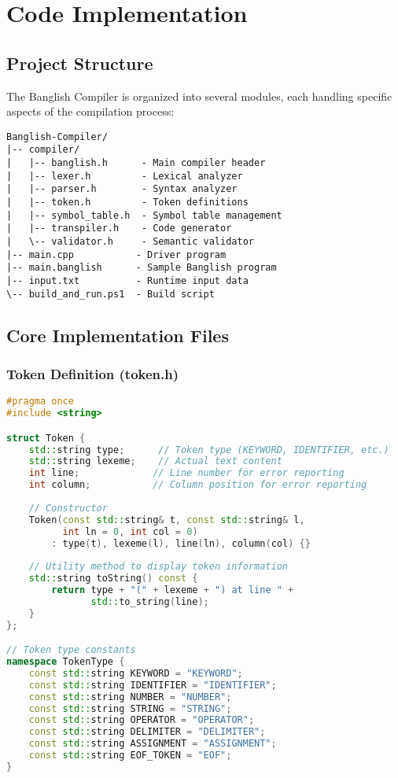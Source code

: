 \documentclass[12pt,a4paper]{article}
\begin{document}
\section{Code Implementation}

\subsection{Project Structure}

The Banglish Compiler is organized into several modules, each handling specific aspects of the compilation process:

\begin{verbatim}
Banglish-Compiler/
|-- compiler/
|   |-- banglish.h      - Main compiler header
|   |-- lexer.h         - Lexical analyzer
|   |-- parser.h        - Syntax analyzer  
|   |-- token.h         - Token definitions
|   |-- symbol_table.h  - Symbol table management
|   |-- transpiler.h    - Code generator
|   \-- validator.h     - Semantic validator
|-- main.cpp           - Driver program
|-- main.banglish      - Sample Banglish program
|-- input.txt          - Runtime input data
\-- build_and_run.ps1  - Build script
\end{verbatim}

\subsection{Core Implementation Files}

\subsubsection{Token Definition (token.h)}

\begin{lstlisting}[language=C++, caption=Token Structure Definition]
#pragma once
#include <string>

struct Token {
    std::string type;      // Token type (KEYWORD, IDENTIFIER, etc.)
    std::string lexeme;    // Actual text content
    int line;             // Line number for error reporting
    int column;           // Column position for error reporting
    
    // Constructor
    Token(const std::string& t, const std::string& l, 
          int ln = 0, int col = 0)
        : type(t), lexeme(l), line(ln), column(col) {}
    
    // Utility method to display token information
    std::string toString() const {
        return type + "(" + lexeme + ") at line " + 
               std::to_string(line);
    }
};

// Token type constants
namespace TokenType {
    const std::string KEYWORD = "KEYWORD";
    const std::string IDENTIFIER = "IDENTIFIER";
    const std::string NUMBER = "NUMBER";
    const std::string STRING = "STRING";
    const std::string OPERATOR = "OPERATOR";
    const std::string DELIMITER = "DELIMITER";
    const std::string ASSIGNMENT = "ASSIGNMENT";
    const std::string EOF_TOKEN = "EOF";
}
\end{lstlisting}
\end{document}
